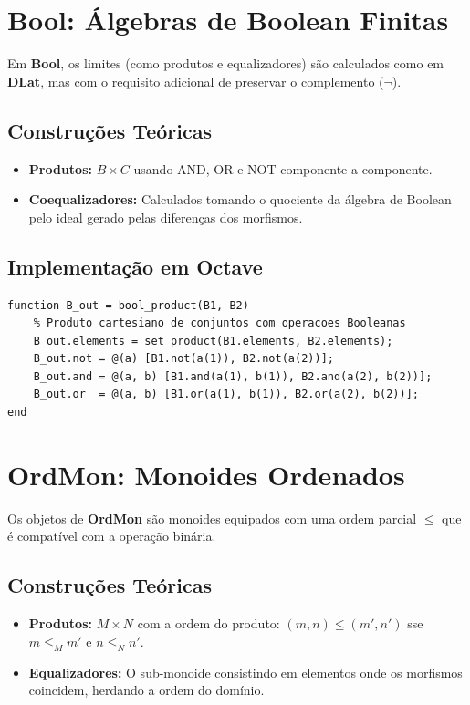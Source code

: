 \documentclass{article}
\begin{document}
\newpage

\section{Bool: Álgebras de Boolean Finitas}

Em \textbf{Bool}, os limites (como produtos e equalizadores) são calculados como em \textbf{DLat}, mas com o requisito adicional de preservar o complemento ($\neg$).

\subsection{Construções Teóricas}
\begin{itemize}
    \item \textbf{Produtos:} $B \times C$ usando AND, OR e NOT componente a componente.
    \item \textbf{Coequalizadores:} Calculados tomando o quociente da álgebra de Boolean pelo ideal gerado pelas diferenças dos morfismos.
\end{itemize}

\subsection{Implementação em Octave}
\begin{lstlisting}[caption={Construções Bool}]
function B_out = bool_product(B1, B2)
    % Produto cartesiano de conjuntos com operacoes Booleanas
    B_out.elements = set_product(B1.elements, B2.elements);
    B_out.not = @(a) [B1.not(a(1)), B2.not(a(2))];
    B_out.and = @(a, b) [B1.and(a(1), b(1)), B2.and(a(2), b(2))];
    B_out.or  = @(a, b) [B1.or(a(1), b(1)), B2.or(a(2), b(2))];
end
\end{lstlisting}

\newpage

\section{OrdMon: Monoides Ordenados}

Os objetos de \textbf{OrdMon} são monoides equipados com uma ordem parcial $\le$ que é compatível com a operação binária.

\subsection{Construções Teóricas}
\begin{itemize}
    \item \textbf{Produtos:} $M \times N$ com a ordem do produto: $(m, n) \le (m', n')$ sse $m \le_M m'$ e $n \le_N n'$.
    \item \textbf{Equalizadores:} O sub-monoide consistindo em elementos onde os morfismos coincidem, herdando a ordem do domínio.
\end{itemize}
\end{document}
